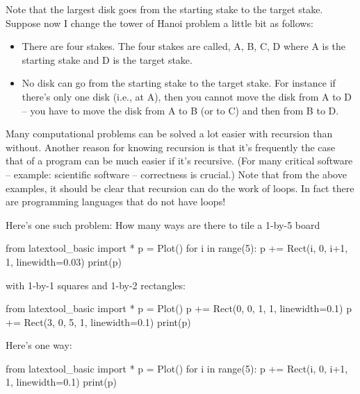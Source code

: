 Note that the largest disk goes from the starting stake to the target
stake. Suppose now I change the tower of Hanoi problem a little bit as
follows:

\begin{itemize}
\item There are four stakes. The four stakes are called, A, B, C, D where A
  is the starting stake and D is the target stake.
\item No disk can go from the starting stake to the target stake. For
  instance if there's only one disk (i.e., at A), then you cannot move
  the disk from A to D -- you have to move the disk from A to B (or to
  C) and then from B to D.
\end{itemize}






Many computational problems can be solved a lot easier with recursion
than without. Another reason for knowing recursion is that
it's frequently the case that
 of a program can be
 much easier if
it's recursive. (For many critical software -- example:
scientific software -- correctness is crucial.) Note that from the above
examples, it should be clear that recursion can do the work of loops. In
fact there are programming languages that do not have loops!


\newpage{}

Here's one such problem: How many ways are there to tile
a 1-by-5 board

\begin{python}
from latextool_basic import *
p = Plot()
for i in range(5):
    p += Rect(i, 0, i+1, 1, linewidth=0.03)
print(p)
\end{python}

with 1-by-1 squares and 1-by-2 rectangles:

\begin{python}
from latextool_basic import *
p = Plot()
p += Rect(0, 0, 1, 1, linewidth=0.1)
p += Rect(3, 0, 5, 1, linewidth=0.1)
print(p)
\end{python}

Here's one way:

\begin{python}
from latextool_basic import *
p = Plot()
for i in range(5):
    p += Rect(i, 0, i+1, 1, linewidth=0.1)
print(p)
\end{python}


